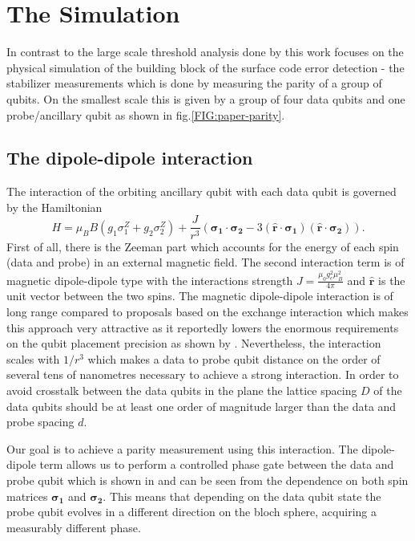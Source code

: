 \section{The Simulation} \label{sec:simulation}
In contrast to the large scale threshold analysis done by \citet{OGorman2016} this work focuses on the physical simulation of the building block of the surface code error detection - the stabilizer measurements which is done by measuring the parity of a group of qubits. On the smallest scale this is given by a group of four data qubits and one probe/ancillary qubit as shown in fig.\@ \ref{FIG:paper-parity}. 

\subsection{The dipole-dipole interaction}\label{sec:dipole-dipole}

The interaction of the orbiting ancillary qubit with each data qubit is governed by the Hamiltonian
\begin{equation*}
H = \mu_B B( g_1 \sigma_1^Z + g_2 \sigma_2^Z) + \frac{J}{r^3} ( \mathbf{\sigma_1} \cdot \mathbf{\sigma_2} - 3 ( \hat{\mathbf{r}} \cdot \mathbf{\sigma_1}) ( \hat{\mathbf{r}}\cdot \mathbf{\sigma_2})).
\end{equation*}
First of all, there is the Zeeman part which accounts for the energy of each spin (data and probe) in an external magnetic field. The second interaction term is of magnetic dipole-dipole type with the interactions strength $J=\frac{\mu_0 g_e^2 \mu_B^2}{4\pi}$ and $\hat{\mathbf{r}}$ is the unit vector between the two spins. The magnetic dipole-dipole interaction is of long range compared to proposals based on the exchange interaction \cite{Kane1998a} which makes this approach very attractive as it reportedly lowers the enormous requirements on the qubit placement precision as shown by \citet{OGorman2016}. Nevertheless, the interaction scales with $1/r^3$ which makes a data to probe qubit distance on the order of several tens of nanometres necessary to achieve a strong interaction. In order to avoid crosstalk between the data qubits in the plane the lattice spacing $D$ of the data qubits should be at least one order of magnitude larger than the data and probe spacing $d$. 

Our goal is to achieve a parity measurement using this interaction. The dipole-dipole term allows us to perform a controlled phase gate between the data and probe qubit which is shown in \cite{OGorman2016} and can be seen from the dependence on both spin matrices $\mathbf{\sigma_1}$ and $\mathbf{\sigma_2}$. This means that depending on the data qubit state the probe qubit evolves in a different direction on the bloch sphere, acquiring a measurably different phase. 

